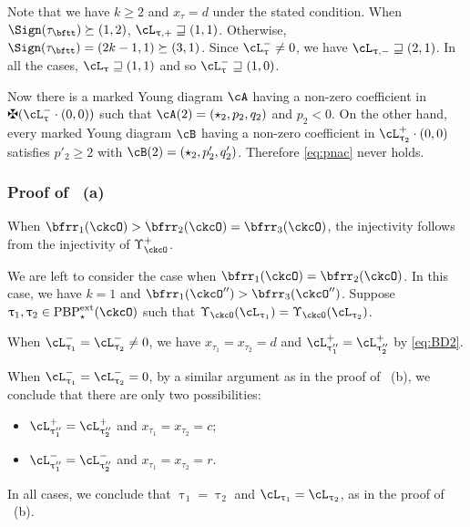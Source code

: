 \documentclass[12pt,a4paper]{amsart}
\numberwithin{equation}{section}
\theoremstyle{remark}
\def\PBPes{\mathrm{PBP}^{\mathrm{ext}}_{\star}}
\def\PBP{\mathrm{PBP}}
\begin{document}
  Note that we have $k\geq 2$ and $x_{\tau}=d$ under the stated condition.
  When $\Sign( {\tau}_{\bftt} )\succeq (1,2)$, $\ppac{\uptau}\sqsupseteq (1,1)$.
  Otherwise, $\Sign( \tau_{\bftt} ) = (2k-1,1)\succeq (3,1)$.
  Since $\nac{\uptau}\neq 0$, we have $\nnac{\uptau}\sqsupseteq (2,1)$.
  In all the cases,  $\ac_{\uptau}\sqsupseteq (1,1)$ and so
  $\nac{\uptau}\sqsupseteq (1,0)$.

  Now there is a marked Young diagram $\cA$ having a non-zero coefficient in
  $\maltese (\nac{\uptau}\cdot (0,0))$ such that $\cA(2) = (\star_2, p_2, q_2)$
  and $p_2<0$.
  On the other hand, every marked Young diagram $\cB$ having
  a non-zero coefficient in $\pac{\uptau_2}\cdot(0,0)$ satisfies $p'_2\geq 2$
  with $\cB(2) = (\star_2, p'_2,q'_2)$.
  Therefore \eqref{eq:pnac} never holds.


\subsubsection*{Proof of ~(a)}

When $\bfrr_{1}(\ckcO)>\bfrr_{2}(\ckcO)=\bfrr_{3}(\ckcO)$, the injectivity
follows from the injectivity of $\Upsilon_{\ckcO}^{+}$.

We are left to consider the case when $\bfrr_{1}(\ckcO)=\bfrr_{2}(\ckcO)$.
In this case, we have $k=1$ and $\bfrr_{1}(\ckcO'')>\bfrr_{3}(\ckcO'')$.
Suppose $\uptau_1, \uptau_2\in \PBPes(\ckcO)$ such that
$\Upsilon_{\ckcO}(\ac_{\uptau_{1}}) = \Upsilon_{\ckcO}(\ac_{\uptau_{2}})$.

When $\nac{\uptau_{1}}=\nac{\uptau_{2}}  \neq 0$, we have $x_{\tau_{1}}=x_{\tau_{2}}=d$ and
$\pac{\uptau''_{1}} = \pac{\uptau''_{2}}$ by \eqref{eq:BD2}.

When $\nac{\uptau_{1}}=\nac{\uptau_{2}}=0$, by a similar argument as in the proof of ~(b),
we conclude that there are only two possibilities:
\begin{itemize}
  \item $\pac{\uptau''_{1}} = \pac{\uptau''_{2}}$ and
  $x_{\tau_{1}}=x_{\tau_{2}} = c$;
  \item $\nac{\uptau''_{1}} = \nac{\uptau''_{2}}$ and
  $x_{\tau_{1}}=x_{\tau_{2}} = r$.
\end{itemize}

In all cases,
we conclude that $\uptau_1=\uptau_2$ and $\ac_{\uptau_1} = \ac_{\uptau_2}$, 
as in the proof of ~(b). 
\end{document}
